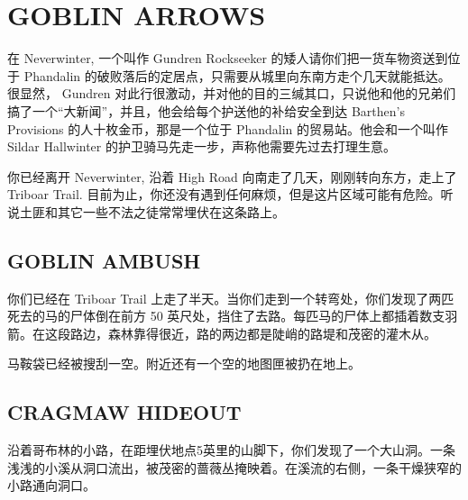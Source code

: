 \documentclass[letterpaper,twocolumn,openany,nodeprecatedcode]{dndbook}
\begin{document}
\tableofcontents

\chapter{GOBLIN ARROWS}

\begin{DndReadAloud}
  \begin{chinese}
    在 Neverwinter, 一个叫作 Gundren Rockseeker 的矮人请你们把一货车物资送到位于 Phandalin 的破败落后的定居点，只需要从城里向东南方走个几天就能抵达。很显然， Gundren 对此行很激动，并对他的目的三缄其口，只说他和他的兄弟们搞了一个“大新闻”，并且，他会给每个护送他的补给安全到达 Barthen's Provisions 的人十枚金币，那是一个位于 Phandalin 的贸易站。他会和一个叫作 Sildar Hallwinter 的护卫骑马先走一步，声称他需要先过去打理生意。

    你已经离开 Neverwinter, 沿着 High Road 向南走了几天，刚刚转向东方，走上了 Triboar Trail. 目前为止，你还没有遇到任何麻烦，但是这片区域可能有危险。听说土匪和其它一些不法之徒常常埋伏在这条路上。
  \end{chinese}
\end{DndReadAloud}

\section{GOBLIN AMBUSH}

\begin{DndReadAloud}
  \begin{chinese}
    你们已经在 Triboar Trail 上走了半天。当你们走到一个转弯处，你们发现了两匹死去的马的尸体倒在前方 50 英尺处，挡住了去路。每匹马的尸体上都插着数支羽箭。在这段路边，森林靠得很近，路的两边都是陡峭的路堤和茂密的灌木从。
  \end{chinese}
\end{DndReadAloud}

\begin{DndReadAloud}
  \begin{chinese}
    马鞍袋已经被搜刮一空。附近还有一个空的地图匣被扔在地上。
  \end{chinese}
\end{DndReadAloud}

\section{CRAGMAW HIDEOUT}

\begin{DndReadAloud}
  \begin{chinese}
    沿着哥布林的小路，在距埋伏地点5英里的山脚下，你们发现了一个大山洞。一条浅浅的小溪从洞口流出，被茂密的蔷薇丛掩映着。在溪流的右侧，一条干燥狭窄的小路通向洞口。
  \end{chinese}
\end{DndReadAloud}
\end{document}
